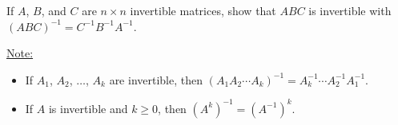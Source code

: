 \documentclass[20pt,a4paper]{extarticle}
\newcounter{example}
\newcounter{theorem}
\begin{document}
\begin{solution}

\end{solution}

\vspace*{10cm}

\begin{example}
If $A$, $B$, and $C$ are $n \times n$ invertible matrices, show that $ABC$ is invertible with $(ABC)^{-1} = C^{-1} B^{-1} A^{-1}$.
\end{example}

\begin{solution}

\end{solution}

\vfill 

\underline{Note:}
	\begin{itemize}
		\item If $A_1$, $A_2$, $\ldots$, $A_k$ are invertible, then $(A_1 A_2 \cdots A_k )^{-1} = A_k^{-1} \cdots A_2^{-1} A_1^{-1}$.
		\item If $A$ is invertible and $k \geq 0$, then $(A^k)^{-1} = (A^{-1})^k$. 
	\end{itemize}



\begin{comment}

\newpage 

\begin{example}
Let $Q = \begin{bmatrix} A & 0 \\ Y & B \end{bmatrix}$ be block matrices where $A$ is $m \times m$ and $B$ is $n \times n$. Show that $Q$ is invertible if and only if $A$ and $B$ are both invertible and find an expression of $Q^{-1}$.
\end{example}

\begin{theorem}
The following conditions are equivalent for an $n \times n$ matrix $A$:
	\begin{enumerate}
		\item $A$ is invertible.
		\item The homogeneous system $A \mathbf{x} = \mathbf{0}$ has only the trivial solution $\mathbf{0}$.
		\item $A$ can be carried to the identity matrix $I_n$ by elementary row operations.
		\item The system $A \mathbf{x} = \mathbf{b}$ has a only one solution $\mathbf{x}$ for every choice of column vector $\mathbf{b}$.
		\item There exists an $n \times n$ matrix $C$ such that $AC = I_n$.
	\end{enumerate}
\end{theorem}
\end{comment}
\end{document}
